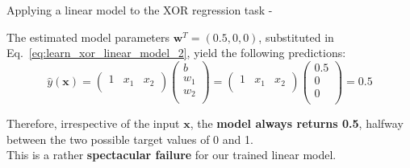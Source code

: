 \begin{frame}[t,allowframebreaks]{
    Applying a linear model to the XOR regression task -}
    \framebreak


    The estimated model parameters $\mathbf{w}^T=(0.5, 0, 0)$,
    substituted in Eq.~\ref{eq:learn_xor_linear_model_2}, 
    yield the following predictions:\\
    \vspace{0.4cm}
    \begin{equation}
        \hat{y}(\mathbf{x}) = 
        \begin{pmatrix}
            1 & x_1 & x_2 \\
        \end{pmatrix} 
        \begin{pmatrix}
            b   \\
            w_1 \\
            w_2 \\
        \end{pmatrix} =
        \begin{pmatrix}
            1 & x_1 & x_2 \\
        \end{pmatrix} 
        \begin{pmatrix}
            0.5 \\
            0   \\
            0   \\
        \end{pmatrix} = 0.5
        \label{eq:learn_xor_linear_model_predictions}
    \end{equation}

    Therefore, irrespective of the input $\mathbf{x}$, the {\bf model always returns 0.5}, 
    halfway between the two possible target values of 0 and 1.\\
    \vspace{0.2cm}
    This is a rather {\bf spectacular failure} for our trained linear model.

\end{frame}

%
%
%

